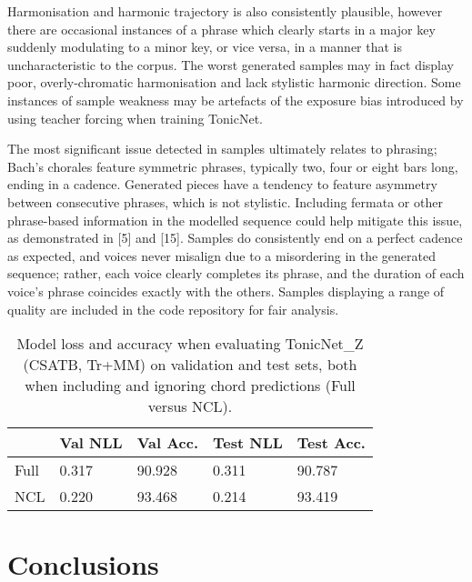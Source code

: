 \documentclass{article}
\begin{document}
Harmonisation and harmonic trajectory is also consistently plausible, however there are occasional instances of a phrase which clearly starts in a major key suddenly modulating to a minor key, or vice versa, in a manner that is uncharacteristic to the corpus. The worst generated samples may in fact display poor, overly-chromatic harmonisation and lack stylistic harmonic direction. Some instances of sample weakness may be artefacts of the exposure bias introduced by using teacher forcing when training TonicNet.

The most significant issue detected in samples ultimately relates to phrasing; Bach's chorales feature symmetric phrases, typically two, four or eight bars long, ending in a cadence. Generated pieces have a tendency to feature asymmetry between consecutive phrases, which is not stylistic. Including fermata or other phrase-based information in the modelled sequence could help mitigate this issue, as demonstrated in [5] and [15]. Samples do consistently end on a perfect cadence as expected, and voices never misalign due to a misordering in the generated sequence; rather, each voice clearly completes its phrase, and the duration of each voice's phrase coincides exactly with the others. Samples displaying a range of quality are included in the code repository for fair analysis.

\begin{table}[]
\begin{tabular}{|l|l|l|l|l|}
\hline
\textbf{} & \textbf{Val NLL} & \textbf{Val Acc.} & \textbf{Test NLL} & \textbf{Test Acc.} \\ \hline
Full      & 0.317            & 90.928            & 0.311             & 90.787             \\ \hline
NCL       & 0.220            & 93.468            & 0.214             & 93.419             \\ \hline
\end{tabular}
\caption{Model loss and accuracy when evaluating TonicNet\_Z (CSATB, Tr+MM) on validation and test sets, both when including and ignoring chord predictions (Full versus NCL).}
\label{tab:my-table}
\end{table}

\section{Conclusions}\label{sec:conc}
\end{document}
